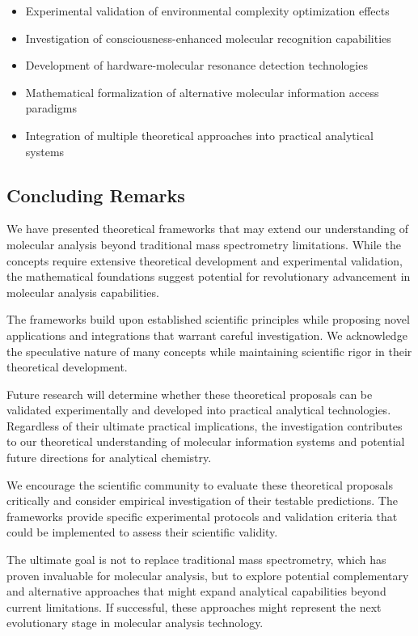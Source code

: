\documentclass[11pt,a4paper]{article}
\theoremstyle{remark}
\begin{document}
{{{{{{{{{{\begin{itemize}
\item Experimental validation of environmental complexity optimization effects
\item Investigation of consciousness-enhanced molecular recognition capabilities
\item Development of hardware-molecular resonance detection technologies
\item Mathematical formalization of alternative molecular information access paradigms
\item Integration of multiple theoretical approaches into practical analytical systems
\end{itemize}

\subsection{Concluding Remarks}

We have presented theoretical frameworks that may extend our understanding of molecular analysis beyond traditional mass spectrometry limitations. While the concepts require extensive theoretical development and experimental validation, the mathematical foundations suggest potential for revolutionary advancement in molecular analysis capabilities.

The frameworks build upon established scientific principles while proposing novel applications and integrations that warrant careful investigation. We acknowledge the speculative nature of many concepts while maintaining scientific rigor in their theoretical development.

Future research will determine whether these theoretical proposals can be validated experimentally and developed into practical analytical technologies. Regardless of their ultimate practical implications, the investigation contributes to our theoretical understanding of molecular information systems and potential future directions for analytical chemistry.

We encourage the scientific community to evaluate these theoretical proposals critically and consider empirical investigation of their testable predictions. The frameworks provide specific experimental protocols and validation criteria that could be implemented to assess their scientific validity.

The ultimate goal is not to replace traditional mass spectrometry, which has proven invaluable for molecular analysis, but to explore potential complementary and alternative approaches that might expand analytical capabilities beyond current limitations. If successful, these approaches might represent the next evolutionary stage in molecular analysis technology.

}}}}}}}}}}
\end{document}
